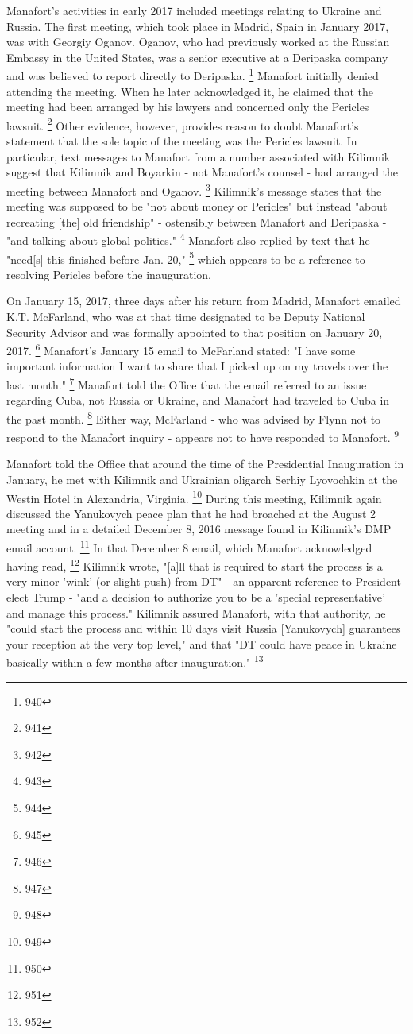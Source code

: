 Manafort's activities in early 2017 included meetings relating to Ukraine and Russia.
The first meeting, which took place in Madrid, Spain in January 2017, was with Georgiy Oganov.
Oganov, who had previously worked at the Russian Embassy in the United States, was a senior executive at a Deripaska company and was believed to report directly to Deripaska.%
\footnote{940}
Manafort initially denied attending the meeting.
When he later acknowledged it, he claimed that the meeting had been arranged by his lawyers and concerned only the Pericles lawsuit.%
\footnote{941}
Other evidence, however, provides reason to doubt Manafort's statement that the sole topic of the meeting was the Pericles lawsuit.
In particular, text messages to Manafort from a number associated with Kilimnik suggest that Kilimnik and Boyarkin - not Manafort's counsel - had arranged the meeting between Manafort and Oganov.%
\footnote{942}
Kilimnik's message states that the meeting was supposed to be "not about money or Pericles" but instead "about recreating [the] old friendship" - ostensibly between Manafort and Deripaska - "and talking about global politics."%
\footnote{943}
Manafort also replied by text that he "need[s] this finished before Jan. 20,"%
\footnote{944}
which appears to be a reference to resolving Pericles before the inauguration.

On January 15, 2017, three days after his return from Madrid, Manafort emailed K.T. McFarland, who was at that time designated to be Deputy National Security Advisor and was formally appointed to that position on January 20, 2017.%
\footnote{945}
Manafort's January 15 email to McFarland stated: "I have some important information I want to share that I picked up on my travels over the last month."%
\footnote{946}
Manafort told the Office that the email referred to an issue regarding Cuba, not Russia or Ukraine, and Manafort had traveled to Cuba in the past month.%
\footnote{947}
Either way, McFarland - who was advised by Flynn not to respond to the Manafort inquiry - appears not to have responded to Manafort.%
\footnote{948}

Manafort told the Office that around the time of the Presidential Inauguration in January, he met with Kilimnik and Ukrainian oligarch Serhiy Lyovochkin at the Westin Hotel in Alexandria, Virginia.%
\footnote{949}
During this meeting, Kilimnik again discussed the Yanukovych peace plan that he had broached at the August 2 meeting and in a detailed December 8, 2016 message found in Kilimnik's DMP email account.%
\footnote{950}
In that December 8 email, which Manafort acknowledged having read,%
\footnote{951}
Kilimnik wrote, "[a]ll that is required to start the process is a very minor 'wink' (or slight push) from DT" - an apparent reference to President-elect Trump - "and a decision to authorize you to be a 'special representative' and manage this process."
Kilimnik assured Manafort, with that authority, he "could start the process and within 10 days visit Russia [Yanukovych] guarantees your reception at the very top level," and that "DT could have peace in Ukraine basically within a few months after inauguration."%
\footnote{952}

